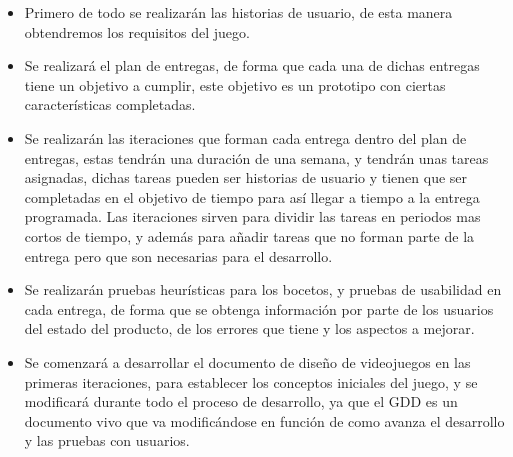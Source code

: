 \begin{itemize}
  \item Primero de todo se realizarán las historias de usuario, de esta manera obtendremos los requisitos del juego.
  \item Se realizará el plan de entregas, de forma que cada una de dichas entregas tiene un objetivo a cumplir, este objetivo es un prototipo con ciertas características completadas.
  \item Se realizarán las iteraciones que forman cada entrega dentro del plan de entregas, estas tendrán una duración de una semana, y tendrán unas tareas asignadas, dichas tareas pueden ser historias de usuario y tienen que ser completadas en el objetivo de tiempo para así llegar a tiempo a la entrega programada. Las iteraciones sirven para dividir las tareas en periodos mas cortos de tiempo, y además para añadir tareas que no forman parte de la entrega pero que son necesarias para el desarrollo.
  \item Se realizarán pruebas heurísticas para los bocetos, y pruebas de usabilidad en cada entrega, de forma que se obtenga información por parte de los usuarios del estado del producto, de los errores que tiene y los aspectos a mejorar.
  \item Se comenzará a desarrollar el documento de diseño de videojuegos en las primeras iteraciones, para establecer los conceptos iniciales del juego, y se modificará durante todo el proceso de desarrollo, ya que el GDD es un documento vivo que va modificándose en función de como avanza el desarrollo y las pruebas con usuarios.
\end{itemize}
